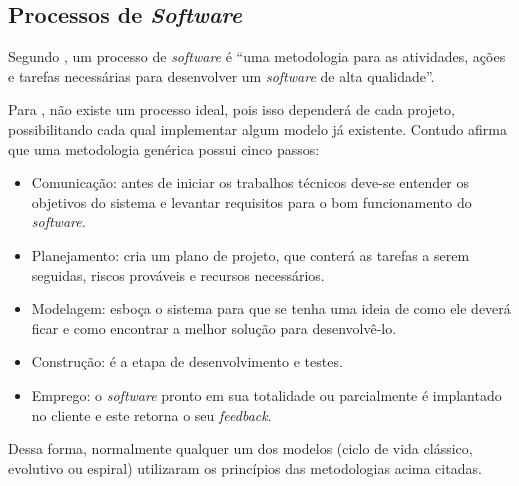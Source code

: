 \subsection{Processos de \textit{Software}}
	
	
	\par Segundo , um processo de \textit{software} é
“uma metodologia para as atividades, ações e tarefas necessárias para
desenvolver um \textit{software} de alta qualidade”.

	\par Para , não existe um processo ideal, pois isso
dependerá de cada projeto, possibilitando cada qual implementar algum modelo já
existente. Contudo  afirma que uma metodologia
genérica possui cinco passos:
	\begin{itemize}
	  
	  \item Comunicação: antes de iniciar os trabalhos técnicos deve-se entender
	  os objetivos do sistema e levantar requisitos para o bom funcionamento do
	  \textit{software}.
	  
	  \item Planejamento: cria um plano de projeto, que conterá as tarefas a
	  serem seguidas, riscos prováveis e recursos necessários.
	  
	  \item Modelagem: esboça o sistema para que se tenha uma ideia de como ele
	  deverá ficar e como encontrar a melhor solução para desenvolvê-lo.
	  
	  \item Construção: é a etapa de desenvolvimento e testes.
	  
	  \item Emprego: o \textit{software} pronto em sua totalidade ou parcialmente
	  é implantado no cliente e este retorna o seu \textit{feedback}.
	 
	 \end{itemize}
	 
	 \par Dessa forma, normalmente qualquer um dos modelos (ciclo de vida clássico,
evolutivo ou espiral) utilizaram os princípios das metodologias acima citadas.